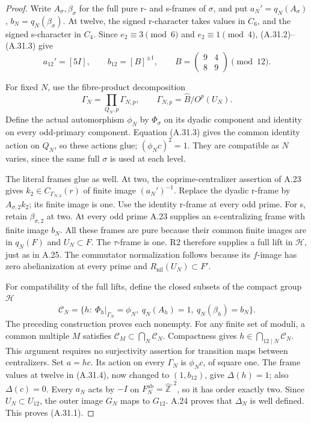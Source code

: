 \begin{proof}
Write \(A_\sigma,\beta_\sigma\) for the full pure
r- and s-frames of \(\sigma\), and put
\(a_N'=q_N(A_\sigma)\), \(b_N=q_N(\beta_\sigma)\).
At twelve, the signed r-character takes values in
\(C_6\), and the signed s-character in \(C_4\).
Since \(e_2\equiv3\pmod6\) and
\(e_2\equiv1\pmod4\), (A.31.2)--(A.31.3) give
\[
 a_{12}'=[5I],\qquad b_{12}=[B]^{\pm1},\qquad
 B=\begin{pmatrix}9&4\\8&9\end{pmatrix}\pmod{12}.
 \tag{A.31.4}
\]

For fixed \(N\), use the fibre-product decomposition
\[
 \Gamma_N=\mathop{\prod}_{Q_N,p}
          \Gamma_{N,p},\qquad
 \Gamma_{N,p}=\widehat B/O^p(U_N).
\]
Define the actual automorphism \(\phi_N\) by
\(\Phi_\sigma\) on its dyadic component and identity
on every odd-primary component. Equation (A.31.3)
gives the common identity action on \(Q_N\), so
these actions glue; \((\phi_Nc)^2=1\).
They are compatible as \(N\) varies, since the same
full \(\sigma\) is used at each level.

The literal frames glue as well. At two, the
coprime-centralizer assertion of A.23 gives
\(k_2\in C_{\Gamma_{N,2}}(r)\) of finite image
\((a_N')^{-1}\). Replace the dyadic r-frame by
\(A_{\sigma,2}k_2\); its finite image is one.
Use the identity r-frame at every odd prime.
For s, retain \(\beta_{\sigma,2}\) at two.
At every odd prime A.23 supplies an s-centralizing
frame with finite image \(b_N\). All these frames
are pure because their common finite images are
in \(q_N(F)\) and \(U_N\subset F\).
The \(\tau\)-frame is one. R2 therefore supplies
a full lift in \(\mathcal H\), just as in A.25.
The commutator normalization follows because its
\(f\)-image has zero abelianization at every prime
and \(R_{\mathrm{nil}}(U_N)\subset F'\).

For compatibility of the full lifts, define the closed
subsets of the compact group \(\mathcal H\)
\[
 \mathcal C_N=\{h:\ \Phi_h|_{\Gamma_N}=\phi_N,
       \ q_N(A_h)=1,\ q_N(\beta_h)=b_N\}.
\]
The preceding construction proves each nonempty.
For any finite set of moduli, a common multiple
\(M\) satisfies \(\mathcal C_M\subset\bigcap_N
\mathcal C_N\). Compactness gives
\(h\in\bigcap_{12\mid N}\mathcal C_N\).
This argument requires no surjectivity assertion
for transition maps between centralizers.
Set \(a=hc\). Its action on every \(\Gamma_N\)
is \(\phi_Nc\), of square one. The frame values
at twelve in (A.31.4), now changed to \((1,b_{12})\),
give \(\Delta(h)=1\); also \(\Delta(c)=0\).
Every \(a_N\) acts by \(-I\) on
\(F_N^{\mathrm{ab}}=\widehat{\mathbb Z}^{,2}\),
so it has order exactly two. Since \(U_N\subset U_{12}\),
the outer image \(G_N\) maps to \(G_{12}\).
A.24 proves that \(\Delta_N\) is well defined.
This proves (A.31.1).


\end{proof}

